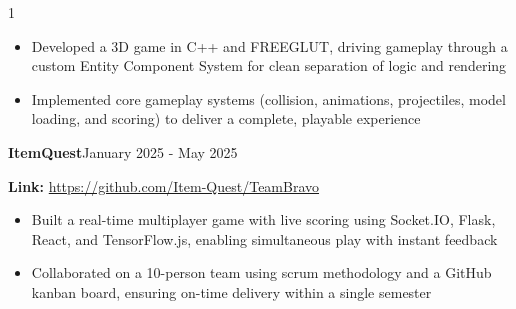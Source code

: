 \documentclass[11pt]{article}
\newcommand{\project}[4]{
    \noindent \textbf{#1}\normalsize \hfill #2
    \par
    \noindent #3
    #4
}
\begin{document}
\begin{spacing}{1}
{\begin{itemize}
                \setlength{\parsep}{0pt}
                \setlength{\parskip}{0pt}
                \item Developed a 3D game in C++ and FREEGLUT, driving gameplay through a custom Entity Component System for clean separation of logic and rendering
                \item Implemented core gameplay systems (collision, animations, projectiles, model loading, and scoring) to deliver a complete, playable experience
            \end{itemize}
            \par
        }
        \project{ItemQuest}{January 2025 - May 2025}{\textbf{Link:} \url{https://github.com/Item-Quest/TeamBravo}}
        {
            \begin{itemize}
                \setlength\itemsep{2pt}
                \setlength{\parsep}{0pt}
                \setlength{\parskip}{0pt}
                \item Built a real-time multiplayer game with live scoring using Socket.IO, Flask, React, and TensorFlow.js, enabling simultaneous play with instant feedback
                \item Collaborated on a 10-person team using scrum methodology and a GitHub kanban board, ensuring on-time delivery within a single semester
            \end{itemize}
            \par
        }
    \end{spacing}
\end{document}
